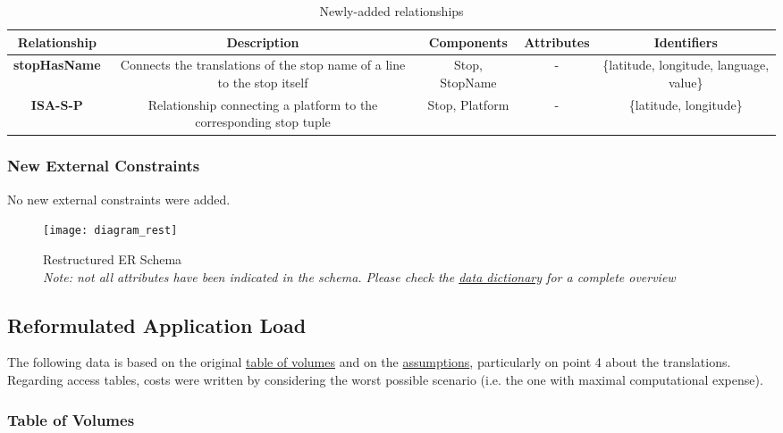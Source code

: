 \begin{table}[htp]
	\centering
	\begin{tabularx}{\columnwidth}{|C|C|C|c|C|}
		\hline
		\textbf{Relationship} & \textbf{Description} & \textbf{Components} & \textbf{{\footnotesize Attributes}} & \textbf{Identifiers} \\
		\hline
		\textbf{stopHasName} & Connects the translations of the stop name of a line to the stop itself & Stop, StopName & - & \{latitude, longitude, language, value\} \\ \hline
		\textbf{ISA-S-P} & Relationship connecting a platform to the corresponding stop tuple & Stop, Platform & - & \{latitude, longitude\} \\ 
		\hline
	\end{tabularx}
	\caption{Newly-added relationships}\label{tbl:relationships-rest}
\end{table}

\subsubsection{New External Constraints}

No new external constraints were added.

\begin{landscape}
	\begin{figure}[htb]
		\thispagestyle{plain}
		\centering
		\texttt{[image: diagram\_rest]}
		\caption{Restructured ER Schema \\ {\footnotesize \textit{Note: not all attributes have been indicated in the schema. Please check the \hyperref[sec:dictionary-rest]{data dictionary} for a complete overview}}}\label{img:diagram_rest}
	\end{figure}
\end{landscape}

\subsection{Reformulated Application Load}

	The following data is based on the original \hyperref[tbl:volumes]{table of volumes} and on the \hyperref[sec:assumptions]{assumptions}, particularly on point 4 about the translations. Regarding access tables, costs were written by considering the worst possible scenario (i.e. the one with maximal computational expense).

	\subsubsection{Table of Volumes}
	
